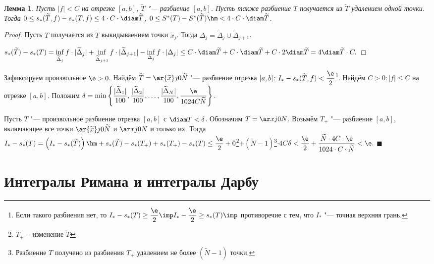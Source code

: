 \documentclass[a4paper,10pt,twoside]{article}
\newtheorem{Th}{Лемма}[section]
\newenvironment{Proof}
       {\par\noindent{\textbf{Доказательство.}}}
       {\hfill$\scriptstyle\blacksquare$}
\let\AVsection\section{}
\renewcommand\section{\newpage\scol\AVsection}
\newcommand{\scol}{  \renewcommand{\headrulewidth}{0.5pt}\fancyhead[RE,LO]{\thesection{} \leftmark} \fancyhead[LE,RO]{\thepage}}
\begin{document}
 \begin{Proof}
 	
 \begin{Th}
 	Пусть $|f|<C$ на отрезке $[a,b]$, $\widetilde T$ "--- разбиение $[a,b]$.
 	Пусть также разбиение $T$ получается из $\widetilde T$ удалением
 	одной точки. Тогда $0\leq s_*(\widetilde T,f)-s_*(T,f)\leq 4\cdot C\cdot\diam \widetilde T$,
    $0\leq S^*(T)-S^*(\widetilde T)\hm<4\cdot C\cdot\diam \widetilde T$.	
 \end{Th}
 
 \begin{proof}
 	Пусть $T$ получается из $\widetilde T$ выкидываением точки $\widetilde x_j$.
 	Тогда $\Delta_j=\widetilde \Delta_j\cup\widetilde\Delta_{j+1}$.
 	
 	$s_*(\widetilde T)-s_*(T)=\inf\limits_{\widetilde \Delta_j}f\cdot|\widetilde\Delta_j|+
 	\inf\limits_{\widetilde\Delta_{j+1}}f\cdot|\widetilde\Delta_{j+1}|-
 	\inf\limits_{\Delta_j}f\cdot|\Delta_j|\leq C\cdot\diam \widetilde T+
 	C\cdot\diam \widetilde T+C\cdot 2\diam \widetilde T=4\diam\widetilde T\cdot C.$
 \end{proof}
 
 Зафиксируем произвольное $\e>0$. Найдём $\widetilde T=\ar{\widetilde x}j0{\widetilde N}$ "--- разбиение 
 отрезка $[a,b]\colon I_*-s_*(\widetilde T,f)<\dfrac{\e}2$\footnote{Если 
 такого разбиения нет, то $I_*-s_*(T)\geq\dfrac{\e}2\imp I_*-\dfrac{\e}2\geq s_*(T)\imp$ противоречие с тем, что $I_*$ "--- точная верхняя грань.}.
 Найдём $C>0\colon |f|\leq C$ на отрезке $[a,b]$. Положим $\delta=\min\left\{\dfrac{|\widetilde\Delta_1|}{100},
 \dfrac{|\widetilde\Delta_2|}{100},\ldots,\dfrac{|\widetilde\Delta_N|}{100},\dfrac{\e}{1024C\widetilde N}\right\}.$
 
 Пусть $T$ "--- произвольное разбиение отрезка $[a,b]$ с $\diam T<\delta$. Обозначим
 $T=\ar xj0N$. Возьмём $T_+$ "--- разбиение $[a,b]$, включающее все точки 
 $\ar{\widetilde x}j0{\widetilde N}$ и $\ar xj0N$ и только их.
 Тогда $I_*-s_*(T)=\left(I_*-s_*(\widetilde T)\right)\hm+s_*(\widetilde T)-
 s_*(T_+)+s_*(T_+)-s_*(T)\leq\dfrac{\e}2+0$\footnote{$T_+ 
 - $изменение $\widetilde T$}$+(\widetilde N-1)$\footnote{Разбиение
 $T$ получено из разбиения $T_+$ удалением не более $(\widetilde N-1)$ точки.}$\cdot4C\delta<\dfrac{\e}2+\dfrac{\widetilde N\cdot4C\cdot\e}{1024\cdot C\cdot \widetilde N}<\e.$
 \end{Proof}
 
 \section{Интегралы Римана и интегралы Дарбу}
 
\end{document}
